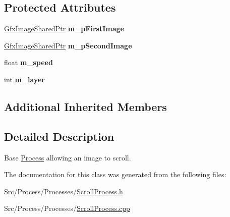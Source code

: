 \subsection*{Protected Attributes}
\begin{DoxyCompactItemize}
\item 
\hypertarget{classScrollProcess_a1523cdc65d08d48d7083d359bc7c4b3f}{\hyperlink{GfxImage_8h_a42b2baf6110731a1a358d365e303e086}{Gfx\-Image\-Shared\-Ptr} {\bfseries m\-\_\-p\-First\-Image}}\label{classScrollProcess_a1523cdc65d08d48d7083d359bc7c4b3f}

\item 
\hypertarget{classScrollProcess_aac54c0fff026b0c73b11389c2027784f}{\hyperlink{GfxImage_8h_a42b2baf6110731a1a358d365e303e086}{Gfx\-Image\-Shared\-Ptr} {\bfseries m\-\_\-p\-Second\-Image}}\label{classScrollProcess_aac54c0fff026b0c73b11389c2027784f}

\item 
\hypertarget{classScrollProcess_afae6df369193286da7e4f265ff0eb6fe}{float {\bfseries m\-\_\-speed}}\label{classScrollProcess_afae6df369193286da7e4f265ff0eb6fe}

\item 
\hypertarget{classScrollProcess_a2f7e3251340156941ba7202a2ec26ae4}{int {\bfseries m\-\_\-layer}}\label{classScrollProcess_a2f7e3251340156941ba7202a2ec26ae4}

\end{DoxyCompactItemize}
\subsection*{Additional Inherited Members}


\subsection{Detailed Description}
Base \hyperlink{classProcess}{Process} allowing an image to scroll. 

The documentation for this class was generated from the following files\-:\begin{DoxyCompactItemize}
\item 
Src/\-Process/\-Processes/\hyperlink{ScrollProcess_8h}{Scroll\-Process.\-h}\item 
Src/\-Process/\-Processes/\hyperlink{ScrollProcess_8cpp}{Scroll\-Process.\-cpp}\end{DoxyCompactItemize}
